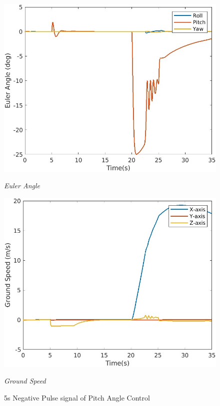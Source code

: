 \begin{figure}[htbp]
  \centering
  \begin{minipage}[b]{0.45\textwidth}
    \centering
    \includegraphics[width=\textwidth]{Images/Attitude Control Plot/1 EulerAngle2.jpg}
    \caption*{\textit{Euler Angle}}
  \end{minipage}
  \hfil
  \begin{minipage}[b]{0.45\textwidth}
    \centering
    \includegraphics[width=\textwidth]{Images/Attitude Control Plot/2 groundspeed_2.jpg}
    \caption*{\textit{Ground Speed}}
  \end{minipage}
  \caption{5s Negative Pulse signal of Pitch Angle Control}
  \label{fig:attitude control -pitch}
\end{figure}

